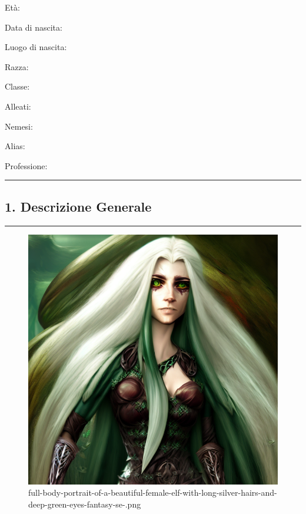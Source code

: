 Età:

Data di nascita:

Luogo di nascita:

Razza:

Classe:

Alleati:

Nemesi:

Alias:

Professione:

\begin{center}\rule{0.5\linewidth}{0.5pt}\end{center}

\subsection{1. Descrizione Generale}\label{descrizione-generale}

\begin{center}\rule{0.5\linewidth}{0.5pt}\end{center}

\begin{figure}
\centering
\includegraphics{full-body-portrait-of-a-beautiful-female-elf-with-long-silver-hairs-and-deep-green-eyes-fantasy-se-.png}
\caption{full-body-portrait-of-a-beautiful-female-elf-with-long-silver-hairs-and-deep-green-eyes-fantasy-se-.png}
\end{figure}

